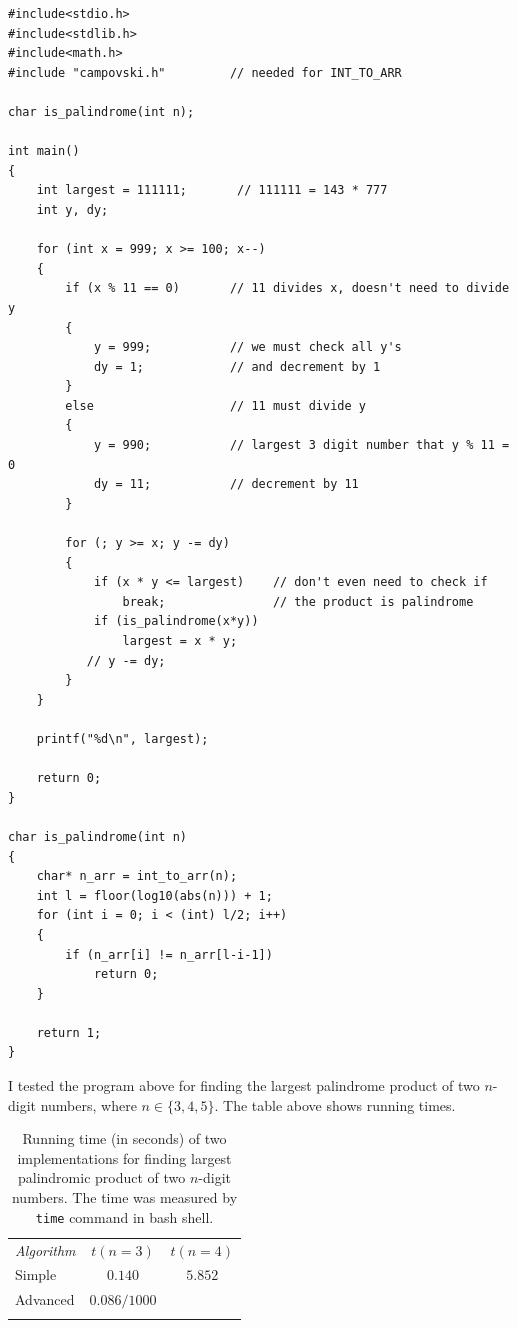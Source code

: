 \documentclass{book}
\begin{document}
\begin{verbatim}
#include<stdio.h>
#include<stdlib.h>
#include<math.h>
#include "campovski.h"         // needed for INT_TO_ARR

char is_palindrome(int n);

int main()
{
    int largest = 111111;       // 111111 = 143 * 777
    int y, dy;

    for (int x = 999; x >= 100; x--)
    {
        if (x % 11 == 0)       // 11 divides x, doesn't need to divide y
        {
            y = 999;           // we must check all y's
            dy = 1;            // and decrement by 1
        }
        else                   // 11 must divide y
        {
            y = 990;           // largest 3 digit number that y % 11 = 0
            dy = 11;           // decrement by 11
        }

        for (; y >= x; y -= dy)
        {
            if (x * y <= largest)    // don't even need to check if
                break;               // the product is palindrome
            if (is_palindrome(x*y))
                largest = x * y;
           // y -= dy;
        }
    }

    printf("%d\n", largest);

    return 0;
}

char is_palindrome(int n)
{
    char* n_arr = int_to_arr(n);
    int l = floor(log10(abs(n))) + 1;
    for (int i = 0; i < (int) l/2; i++)
    {
        if (n_arr[i] != n_arr[l-i-1])
            return 0;
    }

    return 1;
}
\end{verbatim}

I tested the program above for finding the largest palindrome product of two $n$-digit numbers, where $n \in \{3,4,5\}$. The table above shows running times.

\begin{table}[h!]
\centering
\begin{tabular}{||l||c|c||}	
\hhline{|t:===:t|}
\textit{Algorithm} & $t(n=3)$ & $t(n=4)$\\ \hhline{||=||=|=||}
Simple & $0.140$ & $5.852$ \\ \hhline{||-||-|-||}
Advanced & $0.086 / 1000$ & \\ \hhline{|b:===:b|}
\end{tabular}
\caption{Running time (in seconds) of two implementations for finding largest palindromic product of two $n$-digit numbers. The time was measured by \texttt{time} command in bash shell.}
\end{table}
\end{document}
